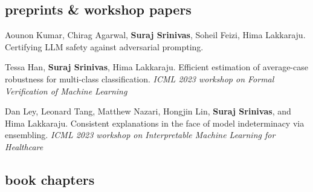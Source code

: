 \documentclass[11pt, a4paper, english]{moderncv}        %
\newcommand{\cvsubsection}[1]{\vspace{0.3cm}\subsection{\large{{#1}}}}
\begin{document}
\vspace*{0.25em}


\vspace*{0.25em}


\cvsubsection{preprints \& workshop papers}

 {Aounon Kumar, Chirag Agarwal, \textbf{Suraj Srinivas}, Soheil Feizi, Hima Lakkaraju. \newline Certifying LLM safety against adversarial prompting.}

\vspace*{0.25em}

 {Tessa Han, \textbf{Suraj Srinivas}, Hima Lakkaraju. \newline Efficient estimation of average-case robustness for multi-class classification. 
\newline \textit{ICML 2023 workshop on Formal Verification of Machine Learning}}

\vspace*{0.25em}

 {Dan Ley, Leonard Tang, Matthew Nazari, Hongjin Lin, \textbf{Suraj Srinivas}, and Hima Lakkaraju. \newline Consistent explanations in the face of model indeterminacy via ensembling.
\newline \textit{ICML 2023 workshop on Interpretable Machine Learning for Healthcare}}

\vspace*{0.25em}


\cvsubsection{book chapters}
\end{document}

